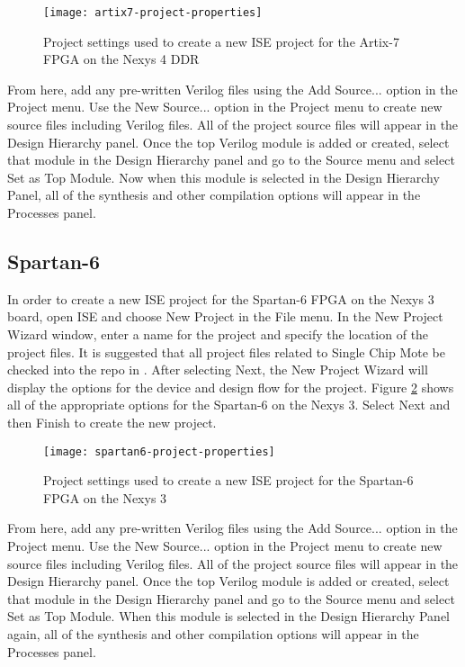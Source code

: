 \begin{figure}
	\centering
	\texttt{[image: artix7-project-properties]}
	\caption{Project settings used to create a new ISE project for the Artix-7 FPGA on the Nexys 4 DDR}
	\label{fig:artix7-project-properties}
\end{figure}

From here, add any pre-written Verilog files using the Add Source... option in the Project menu. Use the New Source... option in the Project menu to create new source files including Verilog files. All of the project source files will appear in the Design Hierarchy panel. Once the top Verilog module is added or created, select that module in the Design Hierarchy panel and go to the Source menu and select Set as Top Module. Now when this module is selected in the Design Hierarchy Panel, all of the synthesis and other compilation options will appear in the Processes panel.

\subsection{Spartan-6}
In order to create a new ISE project for the Spartan-6 FPGA on the Nexys 3 board, open ISE and choose New Project in the File menu. In the New Project Wizard window, enter a name for the project and specify the location of the project files. It is suggested that all project files related to Single Chip Mote be checked into the repo in . After selecting Next, the New Project Wizard will display the options for the device and design flow for the project. Figure \ref{fig:spartan6-project-properties} shows all of the appropriate options for the Spartan-6 on the Nexys 3. Select Next and then Finish to create the new project.

\begin{figure}
\centering
\texttt{[image: spartan6-project-properties]}
\caption{Project settings used to create a new ISE project for the Spartan-6 FPGA on the Nexys 3}
\label{fig:spartan6-project-properties}
\end{figure}

From here, add any pre-written Verilog files using the Add Source... option in the Project menu. Use the New Source... option in the Project menu to create new source files including Verilog files. All of the project source files will appear in the Design Hierarchy panel. Once the top Verilog module is added or created, select that module in the Design Hierarchy panel and go to the Source menu and select Set as Top Module. When this module is selected in the Design Hierarchy Panel again, all of the synthesis and other compilation options will appear in the Processes panel.

